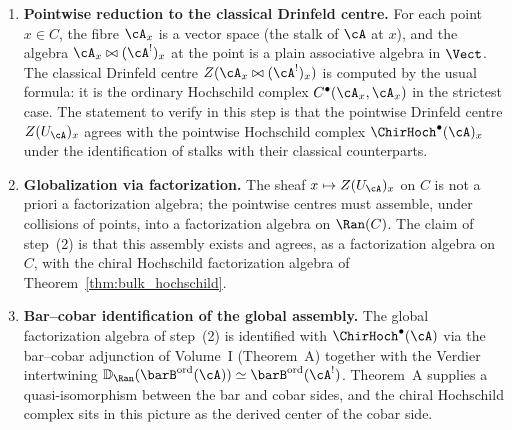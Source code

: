 \begin{enumerate}[label=\textup{(\arabic*)}, leftmargin=2.4em]

\item \textbf{Pointwise reduction to the classical Drinfeld centre.}
For each point $x \in C$, the fibre $\cA_x$ is a vector space (the
stalk of $\cA$ at $x$), and the algebra $\cA_x \bowtie (\cA^!)_x$ at the
point is a plain associative algebra in $\Vect$. The classical Drinfeld
centre $Z(\cA_x \bowtie (\cA^!)_x)$ is computed by the usual formula: it
is the ordinary Hochschild complex $C^\bullet(\cA_x, \cA_x)$ in the
strictest case. The statement to verify in this step is that the
pointwise Drinfeld centre $Z(U_\cA)_x$ agrees with the pointwise
Hochschild complex $\ChirHoch^\bullet(\cA)_x$ under the identification
of stalks with their classical counterparts.

\item \textbf{Globalization via factorization.}
The sheaf $x \mapsto Z(U_\cA)_x$ on $C$ is not a priori a factorization
algebra; the pointwise centres must assemble, under collisions of points,
into a factorization algebra on $\Ran(C)$. The claim of step~(2) is that
this assembly exists and agrees, as a factorization algebra on $C$, with
the chiral Hochschild factorization algebra of
Theorem~\textup{\ref{thm:bulk_hochschild}}.

\item \textbf{Bar--cobar identification of the global assembly.}
The global factorization algebra of step~(2) is identified with
$\ChirHoch^\bullet(\cA)$ via the bar--cobar adjunction of Volume~I
(Theorem~A) together with the Verdier intertwining
$\mathbb{D}_{\Ran}(\barB^{\mathrm{ord}}(\cA))
\simeq \barB^{\mathrm{ord}}(\cA^!)$. Theorem~A supplies a
quasi-isomorphism between the bar and cobar sides, and the chiral
Hochschild complex sits in this picture as the derived center of the
cobar side.
\end{enumerate}

